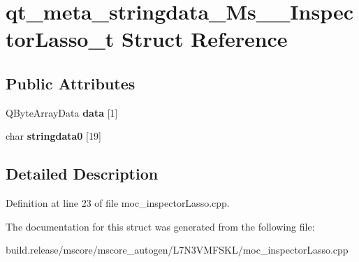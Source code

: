 \hypertarget{structqt__meta__stringdata___ms_____inspector_lasso__t}{}\section{qt\+\_\+meta\+\_\+stringdata\+\_\+\+Ms\+\_\+\+\_\+\+Inspector\+Lasso\+\_\+t Struct Reference}
\label{structqt__meta__stringdata___ms_____inspector_lasso__t}
\subsection*{Public Attributes}
\begin{DoxyCompactItemize}
\item 
\mbox{\label{structqt__meta__stringdata___ms_____inspector_lasso__t_a74b57300734885e87129006408adab0c}} 
Q\+Byte\+Array\+Data {\bfseries data} \mbox{[}1\mbox{]}
\item 
\mbox{\label{structqt__meta__stringdata___ms_____inspector_lasso__t_ae40180660d7703264fabc4ae9c738f8b}} 
char {\bfseries stringdata0} \mbox{[}19\mbox{]}
\end{DoxyCompactItemize}


\subsection{Detailed Description}


Definition at line 23 of file moc\+\_\+inspector\+Lasso.\+cpp.



The documentation for this struct was generated from the following file\+:\begin{DoxyCompactItemize}
\item 
build.\+release/mscore/mscore\+\_\+autogen/\+L7\+N3\+V\+M\+F\+S\+K\+L/moc\+\_\+inspector\+Lasso.\+cpp\end{DoxyCompactItemize}
